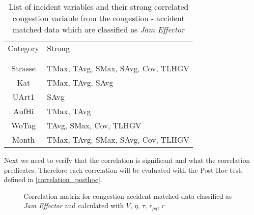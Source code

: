 \begin{table}[h!]
	\centering
	\begin{tabular}{c|l}  
		Category & Strong \\
		\\[-1em]
		\hline
		\\[-1em]
		Strasse & TMax, TAvg, SMax, SAvg, Cov, TLHGV \\ 
 		Kat & TMax, TAvg, SAvg \\ %
 		UArt1 & SAvg \\ %
 		AufHi & TMax, TAvg \\
 		WoTag & TAvg, SMax, Cov, TLHGV \\ %
 		Month & TMax, TAvg, SMax, SAvg, Cov, TLHGV \\ %
	\end{tabular}
    \caption{List of incident variables and their strong correlated congestion variable from the congestion - accident matched data which are classified as \textit{Jam Effector}}
	\label{tbl:correlation_list_baysis_effector}
\end{table}
Next we need to verify that the correlation is significant and what the correlation predicates. Therefore each correlation will be evaluated with the Post Hoc test, defined in \cref{correlation_posthoc}. 
\begin{figure}[!ht]
	\centering
	\caption{Correlation matrix for congestion-accident matched data classified as \textit{Jam Effector} and calculated with $V$, $\eta$, $\tau$, $r_{pq}$, $r$}
	\label{img:correlation_matrix_selected_effector_cramers}
\end{figure}

